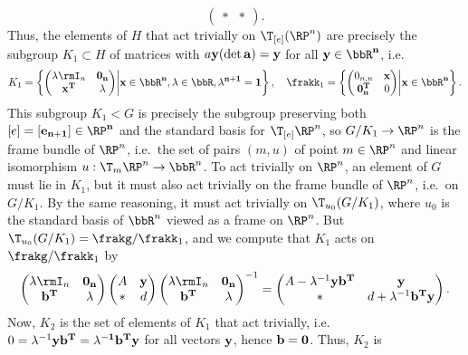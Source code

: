 \begin{example}
\[\begin{pmatrix}
        \ast & \ast
    \end{pmatrix}.
    \]
    Thus, the elements of $H$ that act trivially on $\T_{[e]}(\RP^n)$ are precisely the subgroup $K_1\subset H$ of matrices with $a\bf{y} (\det a)=\bf{y}$ for all $\bf{y}\in\bbR^n$, i.e.\ 
    \[K_1=\left\{ 
        \begin{pmatrix}
            \lambda \rmI_n & \bf{0}_n \\
            \bf{x}^T & \lambda
        \end{pmatrix} \middle| \bf{x}\in\bbR^n,\lambda\in\bbR, \lambda^{n+1}=1
    \right\}, \quad \frakk_1=\left\{ 
        \begin{pmatrix}
            \mathrm{0}_{n,n} & \bf{x} \\
            \bf{0}_n^T & 0
        \end{pmatrix} \middle| \bf{x}\in\bbR^n\right\}.\]
    This subgroup $K_1<G$ is precisely the subgroup preserving both $[e]=[\bf{e}_{n+1}]\in\RP^n$ and the standard basis for $\T_{[e]}\RP^n$, so $G\slash K_1\to \RP^n$ is the frame bundle of $\RP^n$, i.e.\ the set of pairs $(m,u)$ of point $m\in \RP^n$ and linear isomorphism $u:\T_m\RP^n\to \bbR^n$.  To act trivially on $\RP^n$, an element of $G$ must lie in $K_1$, but it must also act trivially on the frame bundle of $\RP^n$, i.e.\ on $G\slash K_1$. By the same reasoning, it must act trivially on $\T_{u_0}(G\slash K_1)$, where $u_0$ is the standard basis of $\bbR^n$ viewed as a frame on $\RP^n$. But $\T_{u_0}(G\slash K_1)=\frakg\slash\frakk_1$, and we compute that $K_1$ acts on $\frakg\slash\frakk_1$ by 
    \[\begin{pmatrix}
        \lambda\rmI_n & \bf{0}_n\\
        \bf{b}^T & \lambda
    \end{pmatrix}
    \begin{pmatrix}
        A & \bf{y} \\
        \ast& d
    \end{pmatrix}
    \begin{pmatrix}
        \lambda\rmI_n & \bf{0}_n\\
        \bf{b}^T & \lambda
    \end{pmatrix}^{-1}=
    \begin{pmatrix}
        A-\lambda^{-1}\bf{y}\bf{b}^T& \bf{y}\\
        \ast  & d+\lambda^{-1}\bf{b}^T\bf{y}
    \end{pmatrix}.
    \]
    Now, $K_2$ is the set of elements of $K_1$ that act trivially, i.e.\ $0=\lambda^{-1}\bf{y}\bf{b}^T=\lambda^{-1}\bf{b}^T\bf{y}$ for all vectors $\bf{y}$, hence $\bf{b}=0$. Thus, $K_2$ is 

\end{example}
